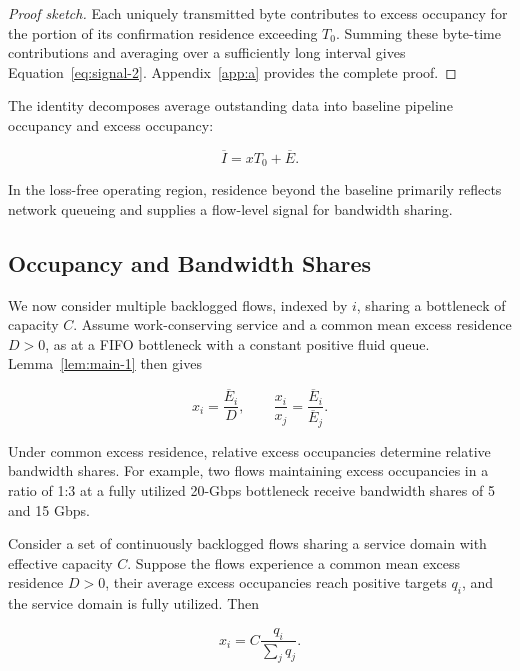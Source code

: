 \begin{proof}[Proof sketch] Each uniquely transmitted byte contributes to excess occupancy for the portion of its confirmation residence exceeding \(T_0\). Summing these byte-time contributions and averaging over a sufficiently long interval gives Equation~\eqref{eq:signal-2}. Appendix~\ref{app:a} provides the complete proof.
\end{proof}

The identity decomposes average outstanding data into baseline pipeline occupancy and excess occupancy:

\begin{equation}
\label{eq:signal-3}
\overline I=xT_0+\overline E.
\end{equation}

In the loss-free operating region, residence beyond the baseline primarily reflects network queueing and supplies a flow-level signal for bandwidth sharing.

\subsection{Occupancy and Bandwidth Shares}
\label{sec:shares}

We now consider multiple backlogged flows, indexed by \(i\), sharing a bottleneck of capacity \(C\). Assume work-conserving service and a common mean excess residence \(D>0\), as at a FIFO bottleneck with a constant positive fluid queue. Lemma~\ref{lem:main-1} then gives

\begin{equation}
\label{eq:signal-4}
x_i=\frac{\overline E_i}{D},
\qquad
\frac{x_i}{x_j}=\frac{\overline E_i}{\overline E_j}.
\end{equation}

Under common excess residence, relative excess occupancies determine relative bandwidth shares. For example, two flows maintaining excess occupancies in a ratio of 1:3 at a fully utilized 20-Gbps bottleneck receive bandwidth shares of 5 and 15 Gbps.

\begin{proposition}
\label{prop:main-1}
Consider a set of continuously backlogged flows sharing a service domain with effective capacity \(C\). Suppose the flows experience a common mean excess residence \(D>0\), their average excess occupancies reach positive targets \(q_i\), and the service domain is fully utilized. Then

\begin{equation}
\label{eq:signal-5}
\boxed{
x_i=C\frac{q_i}{\sum_jq_j}.
}
\end{equation}
\end{proposition}

